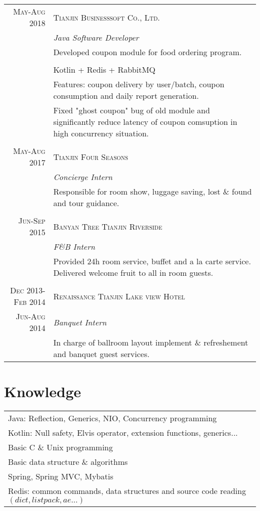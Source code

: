\documentclass[11pt,a4paper]{article}
\begin{document}
\noindent\begin{tabular}{r|p{9.5cm}}

\textsc{May-Aug 2018} 
	& \textsc{Tianjin Businesssoft Co., Ltd.}\\
	&\emph{Java Software Developer}\\

	& Developed coupon module for food ordering program. \\
	& \\
	& Kotlin + Redis + RabbitMQ\\
	& Features: coupon delivery by user/batch, coupon consumption
		and daily report generation.\\
	& Fixed "ghost coupon" bug of old module and significantly reduce latency of coupon comsuption in high concurrency situation.\\
\multicolumn{2}{c}{} \\


\textsc{May-Aug 2017} 
	& \textsc{Tianjin Four Seasons}\\
	&\emph{Concierge Intern}\\

	&Responsible for room show, luggage saving, lost \& found and tour guidance.\\
\multicolumn{2}{c}{} \\


\textsc{Jun-Sep 2015} 
	& \textsc{Banyan Tree Tianjin Riverside}\\
	&\emph{F\&B Intern}\\
	
	&Provided 24h room service, buffet and a la carte service. 
	Delivered welcome fruit to all in room guests. \\
\multicolumn{2}{c}{} \\

\textsc{Dec 2013-Feb 2014} 
	& \textsc{Renaissance Tianjin Lake view Hotel}\\
\textsc{Jun-Aug 2014} 
	& \emph{Banquet Intern}\\
	& In charge of ballroom layout implement \& refreshement and
	banquet guest services.\\

\end{tabular}

\section{Knowledge}
	\noindent\begin{tabular}{p{20cm}}
	Java: Reflection, Generics, NIO, Concurrency programming\\
	Kotlin: Null safety, Elvis operator, extension functions, generics...\\
	Basic C \& Unix programming\\
	Basic data structure \& algorithms\\
	Spring, Spring MVC, Mybatis\\
	Redis: common commands, data structures 
	and source code reading $\left( dict, listpack, ae... \right)$\\
\end{tabular}
\end{document}
